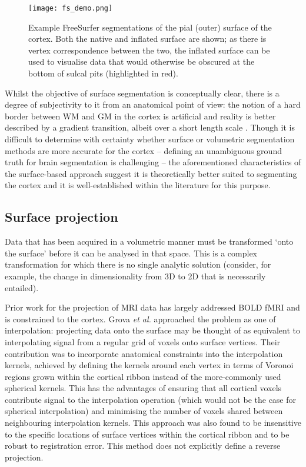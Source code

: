 \begin{figure}
\centering
\texttt{[image: fs\_demo.png]}
\caption{Example FreeSurfer segmentations of the pial (outer) surface of the cortex. Both the native and inflated surface are shown; as there is vertex correspondence between the two, the inflated surface can be used to visualise data that would otherwise be obscured at the bottom of sulcal pits (highlighted in red).}
\label{fs_demo}
\end{figure}

Whilst the objective of surface segmentation is conceptually clear, there is a degree of subjectivity to it from an anatomical point of view: the notion of a hard border between WM and GM in the cortex is artificial and reality is better described by a gradient transition, albeit over a short length scale \cite{Dale1999}. Though it is difficult to determine with certainty whether surface or volumetric segmentation methods are more accurate for the cortex – defining an unambiguous ground truth for brain segmentation is challenging \cite{Shattuck2009} – the aforementioned characteristics of the surface-based approach suggest it is theoretically better suited to segmenting the cortex and it is well-established within the literature for this purpose. 

 
\subsection{Surface projection}
\label{lit_projection_methods}

Data that has been acquired in a volumetric manner must be transformed `onto the surface' before it can be analysed in that space. This is a complex transformation for which there is no single analytic solution (consider, for example, the change in dimensionality from 3D to 2D that is necessarily entailed). 

Prior work for the projection of MRI data has largely addressed BOLD fMRI and is constrained to the cortex. Grova \textit{et al.} \cite{Grova2006} approached the problem as one of interpolation: projecting data onto the surface may be thought of as equivalent to interpolating signal from a regular grid of voxels onto surface vertices. Their contribution was to incorporate anatomical constraints into the interpolation kernels, achieved by defining the kernels around each vertex in terms of Voronoi regions grown within the cortical ribbon instead of the more-commonly used spherical kernels. This has the advantages of ensuring that all cortical voxels contribute signal to the interpolation operation (which would not be the case for spherical interpolation) and minimising the number of voxels shared between neighbouring interpolation kernels. This approach was also found to be insensitive to the specific locations of surface vertices within the cortical ribbon and to be robust to registration error. This method does not explicitly define a reverse projection. 


